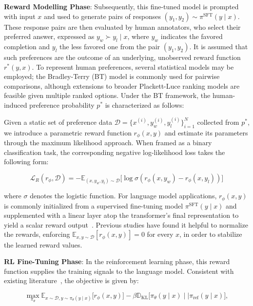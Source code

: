 \textbf{Reward Modelling Phase}: Subsequently, this fine-tuned model is prompted with input $x$ and used to generate pairs of responses $(y_1, y_2)\sim \pi^\text{SFT}(y \mid x)$. These response pairs are then evaluated by human annotators, who select their preferred answer, expressed as $y_w\succ y_l \mid x$, where $y_w$ indicates the favored completion and $y_l$ the less favored one from the pair $(y_1, y_2)$. It is assumed that such preferences are the outcome of an underlying, unobserved reward function $r^*(y, x)$. To represent human preferences, several statistical models may be employed; the Bradley-Terry (BT) model \cite{bradley1952rankanalysis} is commonly used for pairwise comparisons, although extensions to broader Plackett-Luce ranking models \citep{plackett1975analysis, luce2012individual} are feasible given multiple ranked options. Under the BT framework, the human-induced preference probability $p^*$ is characterized as follows:

Given a static set of preference data $\mathcal{D}=\bigl\{x^{(i)}, y_w^{(i)}, y_l^{(i)}\bigr\}_{i=1}^N$ collected from $p^*$, we introduce a parametric reward function $r_{\phi}(x, y)$ and estimate its parameters through the maximum likelihood approach. When framed as a binary classification task, the corresponding negative log-likelihood loss takes the following form:

\begin{equation}\label{eq:reward_model}
    \mathcal{L}_R(r_{\phi}, \mathcal{D}) = -\mathbb{E}_{(x, y_w, y_l)\sim \mathcal{D}}\bigl[\log \sigma(r_{\phi}(x, y_w)- r_{\phi}(x, y_l))\bigr]
\end{equation}

where $\sigma$ denotes the logistic function. For language model applications, $r_{\phi}(x, y)$ is commonly initialized from a supervised fine-tuning model $\pi^\text{SFT}(y \mid x)$ and supplemented with a linear layer atop the transformer's final representation to yield a scalar reward output~\cite{ziegler2020finetuning}. Previous studies have found it helpful to normalize the rewards, enforcing $\mathbb{E}_{x,y\sim \mathcal{D}}\left[r_\phi(x, y)\right] = 0$ for every $x$, in order to stabilize the learned reward values.

\textbf{RL Fine-Tuning Phase}: In the reinforcement learning phase, this reward function supplies the training signals to the language model. Consistent with existing literature~\citep{jaques2017sequence, jaques2020human}, the objective is given by:

\begin{equation}\label{eq:RL}
\max_{\pi_{\theta}}  \mathbb{E}_{x\sim \mathcal{D}, y\sim \pi_{\theta}(y \mid x)}\bigl[r_{\phi}(x, y)\bigr] - \beta\mathbb{D}_{\textrm{KL}}\bigl[\pi_{\theta}(y\mid x)\mid \mid \pi_\text{ref}(y\mid x)\bigr],
\end{equation}

